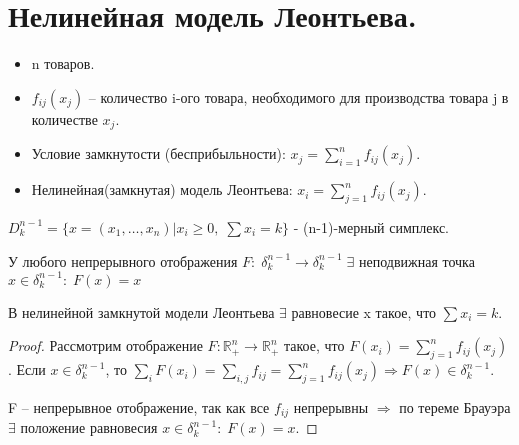 \chapter{Нелинейная модель Леонтьева.}\label{cha:10}

\begin{itemize}
	\item n товаров.
	\item $f_{ij}(x_j)$ -- количество i-ого товара, необходимого для производства товара j в количестве $x_j$.
	\item Условие замкнутости (бесприбыльности): $x_j = \sum\limits_{i = 1}^nf_{ij}(x_j)$.
	\item  Нелинейная(замкнутая) модель Леонтьева: $x_i = \sum\limits_{j = 1}^nf_{ij}(x_j)$.
\end{itemize}

\begin{sign}
	$D_k^{n - 1} = \{x = (x_1, \ldots, x_n) | x_i \geq 0, \; \sum x_i = k\}$ - (n-1)-мерный симплекс.
\end{sign}

\begin{theorem}[Брауэр]
	У любого непрерывного отображения $F: \; \delta_k^{n-1} \rightarrow \delta_k^{n-1} \; \exists$ неподвижная точка $x \in \delta_k^{n-1}: \; F(x) = x$
\end{theorem}

\begin{theorem}
	В нелинейной замкнутой модели Леонтьева $\exists$ равновесие x такое, что $\sum x_i = k$.
\end{theorem}

\begin{proof}
	Рассмотрим отображение $F: \mathbb{R}_{+}^n \rightarrow \mathbb{R}_{+}^n$ такое, что $F(x_i) = \sum\limits_{j = 1}^n f_{ij}(x_j)$. Если $x \in \delta_k^{n-1}$, то $\sum\limits_{i}F(x_i) = \sum\limits_{i,j}f_{ij}= \sum\limits_{j = 1}^nf_{ij}(x_j) \Rightarrow F(x) \in \delta_k^{n-1}.$

	F -- непрерывное отображение, так как все $f_{ij}$ непрерывны $\Rightarrow$ по тереме Брауэра $\exists$ положение равновесия $x \in \delta_k^{n-1}: \; F(x) = x.$
\end{proof}